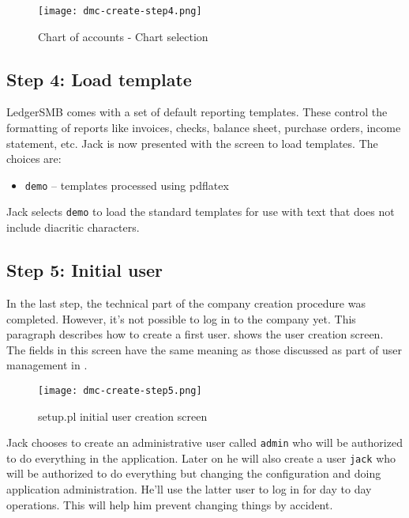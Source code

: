 \begin{figure}[h]
\centering
\texttt{[image: dmc-create-step4.png]}
\caption{Chart of accounts - Chart selection}
\label{fig:setup-step4}
\end{figure}

\subsection{Step 4: Load template}
\label{subsec-create-setup-load-template}

LedgerSMB comes with a set of default reporting templates. 
These control the formatting of reports like invoices, checks, balance sheet, purchase orders, income statement, etc. 
Jack is now presented with the screen to load templates. The choices are:
\begin{itemize}
	\item  \texttt{demo} -- templates processed using pdflatex
\end{itemize}

Jack selects  \texttt{demo} to load the standard templates for use with text that does not include \glspl{diacritic character}.

\subsection{Step 5: Initial user}
\label{subsec-create-setup-initial-user}

In the last step, the technical part of the company creation procedure was completed.
However, it's not possible to log in to the company yet. This paragraph describes how to
create a first user.
 shows the user creation screen. The fields in this screen have
the same meaning as those discussed as part of user management in .

\begin{figure}[h]
\centering
\texttt{[image: dmc-create-step5.png]}
\caption{setup.pl initial user creation screen}
\label{fig:setup-step5}
\end{figure}

Jack chooses to create an administrative user called \texttt{admin} who will be authorized
to do everything in the application. Later on he will also create a user \texttt{jack}
who will be authorized to do everything but changing the configuration and doing application administration.
He'll use the latter user to log in for day to day operations. This will help him prevent
changing things by accident.


